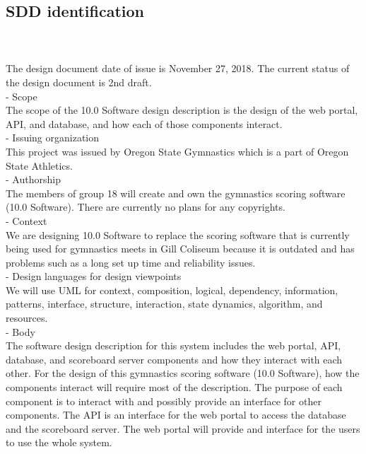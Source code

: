 \documentclass[letterpaper,10pt,draftclsnofoot,onecolumn,]{article}
\begin{document}
\subsection{SDD identification}\\

\\
The design document date of issue is November 27, 2018. The current status of the design document is 2nd draft.\\

- Scope\\
The scope of the 10.0 Software design description is the design of the web portal, API, and database, and how each of those components interact.\\

- Issuing organization\\
This project was issued by Oregon State Gymnastics which is a part of Oregon State Athletics.\\

- Authorship\\
The members of group 18 will create and own the gymnastics scoring software (10.0 Software). There are currently no plans for any copyrights.\\

- Context\\
We are designing 10.0 Software to replace the scoring software that is currently being used for gymnastics meets in Gill Coliseum because it is outdated and has problems such as a long set up time and reliability issues.\\

- Design languages for design viewpoints\\
We will use UML for context, composition, logical, dependency, information, patterns, interface, structure, interaction, state dynamics, algorithm, and resources.\\

- Body\\
The software design description for this system includes the web portal, API, database, and scoreboard server components and how they interact with each other. For the design of this gymnastics scoring software (10.0 Software), how the components interact will require most of the description. The purpose of each component is to interact with and possibly provide an interface for other components. The API is an interface for the web portal to access the database and the scoreboard server. The web portal will provide and interface for the users to use the whole system.\\
\end{document}
